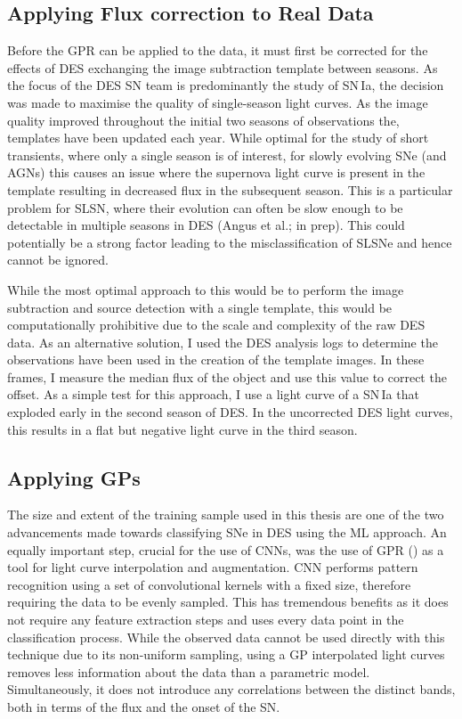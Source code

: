 \subsection{Applying Flux correction to Real Data}
Before the GPR can be applied to the data, it must first be corrected for the effects of DES exchanging the image subtraction template between seasons. As the focus of the DES SN team is predominantly the study of SN\,Ia, the decision was made to maximise the quality of single-season light curves. As the image quality improved throughout the initial two seasons of observations the, templates have been updated each year. While optimal for the study of short transients, where only a single season is of interest, for slowly evolving SNe (and AGNs) this causes an issue where the supernova light curve is present in the template resulting in decreased flux in the subsequent season. This is a particular problem for SLSN, where their evolution can often be slow enough to be detectable in multiple seasons in DES (Angus et al.; in prep). This could potentially be a strong factor leading to the misclassification of SLSNe and hence cannot be ignored.

While the most optimal approach to this would be to perform the image subtraction and source detection with a single template, this would be computationally prohibitive due to the scale and complexity of the raw DES data. As an alternative solution, I used the DES analysis logs to determine the observations have been used in the creation of the template images. In these frames, I measure the median flux of the object and use this value to correct the offset. As a simple test for this approach, I use a light curve of a SN\,Ia that exploded early in the second season of DES. In the uncorrected DES light curves, this results in a flat but negative light curve in the third season.

\subsection{Applying GPs} \label{sec:UseGP}
The size and extent of the training sample used in this thesis are one of the two advancements made towards classifying SNe in DES using the ML approach. An equally important step, crucial for the use of CNNs, was the use of GPR () as a tool for light curve interpolation and augmentation. CNN performs pattern recognition using a set of convolutional kernels with a fixed size, therefore requiring the data to be evenly sampled. This has tremendous benefits as it does not require any feature extraction steps and uses every data point in the classification process. While the observed data cannot be used directly with this technique due to its non-uniform sampling, using a GP interpolated light curves removes less information about the data than a parametric model. Simultaneously, it does not introduce any correlations between the distinct bands, both in terms of the flux and the onset of the SN.

